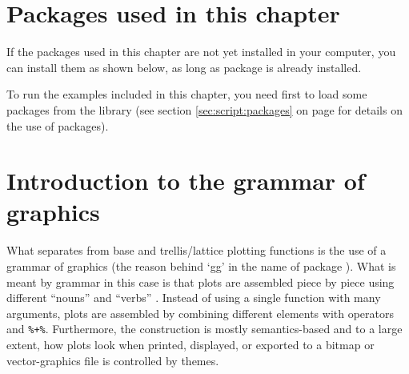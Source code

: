 \documentclass[krantz2]{krantz}\usepackage{knitr}
\begin{document}
\section{Packages used in this chapter}



If the packages used in this chapter are not yet installed in your computer, you can install them as shown below, as long as package  is already installed.

\begin{knitrout}\footnotesize
{}\color{fgcolor}\begin{kframe}
\begin{alltt}
\hlopt{::}
\end{alltt}
\end{kframe}
\end{knitrout}

To run the examples included in this chapter, you need first to load some packages from the library (see section \ref{sec:script:packages} on page \pageref{sec:script:packages} for details on the use of packages).

\begin{knitrout}\footnotesize
{}\color{fgcolor}\begin{kframe}
\begin{alltt}
\end{alltt}
\end{kframe}
\end{knitrout}





\section{Introduction to the grammar of graphics}
What separates \ggplot from base \Rlang and trellis/lattice plotting functions is the use of a grammar of graphics (the reason behind `gg' in the name of package ). What is meant by grammar in this case is that plots are assembled piece by piece using different ``nouns'' and ``verbs'' \autocite{Cleveland1985}. Instead of using a single function with many arguments, plots are assembled by combining different elements with operators \code{+} and \verb|%+%|. Furthermore, the construction is mostly semantics-based and to a large extent, how plots look when printed, displayed, or exported to a bitmap or vector-graphics file is controlled by themes.
\end{document}
